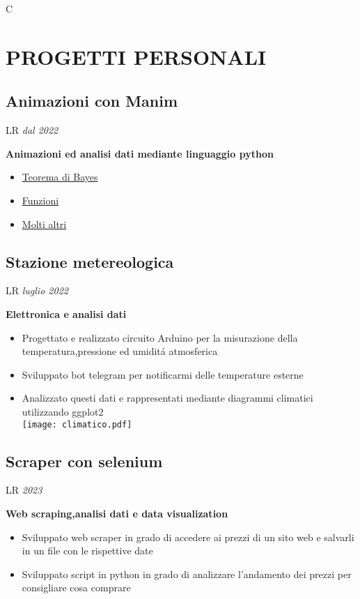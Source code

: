 \documentclass[11pt,a4paper]{moderncv}
\newcommand*{\experienceentry}[3][1.5mm]{
    \subsection{#2} \vspace{-1.5mm}
    \begin{tabularx}{\textwidth}{LR}
        {\itshape #3}
    \end{tabularx}
    \par\addvspace{#1}
}
\begin{document}
\maketitle
\vspace{-9.0mm}
\begin{tabularx}{\textwidth}{C}
    \emailsymbol\enspace {} 
\end{tabularx}
\vspace{-2.0mm}

\begin{minipage}[t]{0.62\textwidth}
\section{PROGETTI PERSONALI}
\experienceentry{Animazioni con Manim}{dal 2022}

\textbf{Animazioni ed analisi dati mediante linguaggio python}
\begin{itemize}
    \item \href{https://youtu.be/O17m9bKEgNs?feature=shared}{Teorema di Bayes}
    \item \href{https://youtu.be/3SJeTFr3EhY?feature=shared}{Funzioni}
    \item \href{https://github.com/1ilir0lika/video-con-manim}{Molti altri}
\end{itemize}
\vspace{1.0mm}

\experienceentry{Stazione metereologica}{luglio 2022}

\textbf{Elettronica e analisi dati}
\begin{itemize}
    \item Progettato e realizzato circuito Arduino per la misurazione della temperatura,pressione ed umiditá atmosferica
    \item Sviluppato bot telegram per notificarmi delle temperature esterne
    \item Analizzato questi dati e rappresentati mediante diagrammi climatici utilizzando ggplot2 \\
    \texttt{[image: climatico.pdf]}
\end{itemize}
\vspace{2.0mm}

\experienceentry{Scraper con selenium}{2023}

\textbf{Web scraping,analisi dati e data visualization}
\begin{itemize}
    \item Sviluppato web scraper in grado di accedere ai prezzi di un sito web e salvarli in un file con le rispettive date
    \item Sviluppato script in python in grado di analizzare l'andamento dei prezzi per consigliare cosa comprare
\end{itemize}
\vspace{1.0mm}


\end{minipage}
\end{document}
